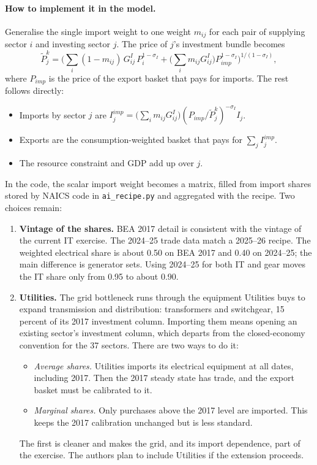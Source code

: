 \paragraph{How to implement it in the model.} Generalise the single import weight to one weight
$m_{ij}$ for each pair of supplying sector $i$ and investing sector $j$. The price of $j$'s
investment bundle becomes
\[
\tilde P^k_{j}=\Big(\sum_i (1-m_{ij})\,G^I_{ij}\,P_i^{1-\sigma_I}+\Big(\sum_i m_{ij}G^I_{ij}\Big)P_{imp}^{1-\sigma_I}\Big)^{1/(1-\sigma_I)},
\]
where $P_{imp}$ is the price of the export basket that pays for imports. The rest follows
directly:
\begin{itemize}
  \item Imports by sector $j$ are
    $I^{imp}_j=\big(\sum_im_{ij}G^I_{ij}\big)(P_{imp}/\tilde P^k_j)^{-\sigma_I}I_j$.
  \item Exports are the consumption-weighted basket that pays for $\sum_jI^{imp}_j$.
  \item The resource constraint and GDP add up over $j$.
\end{itemize}
In the code, the scalar import weight becomes a matrix, filled from import shares stored by NAICS
code in \texttt{ai\_recipe.py} and aggregated with the recipe. Two choices remain:
\begin{enumerate}
  \item \textbf{Vintage of the shares.} BEA 2017 detail is consistent with the vintage of the
    current IT exercise. The 2024--25 trade data match a 2025--26 recipe. The weighted
    electrical share is about 0.50 on BEA 2017 and 0.40 on 2024--25; the main difference is
    generator sets. Using 2024--25 for both IT and gear moves the IT share only from 0.95 to about
    0.90.
  \item \textbf{Utilities.} The grid bottleneck runs through the equipment Utilities buys to
    expand transmission and distribution: transformers and switchgear, 15 percent of its 2017
    investment column. Importing them means opening an existing sector's investment column, which
    departs from the closed-economy convention for the 37 sectors. There are two ways to do it:
    \begin{itemize}
      \item \emph{Average shares.} Utilities imports its electrical equipment at all dates,
        including 2017. Then the 2017 steady state has trade, and the export basket must be
        calibrated to it.
      \item \emph{Marginal shares.} Only purchases above the 2017 level are imported. This keeps
        the 2017 calibration unchanged but is less standard.
    \end{itemize}
    The first is cleaner and makes the grid, and its import dependence, part of the exercise.
    The authors plan to include Utilities if the extension proceeds.
\end{enumerate}

